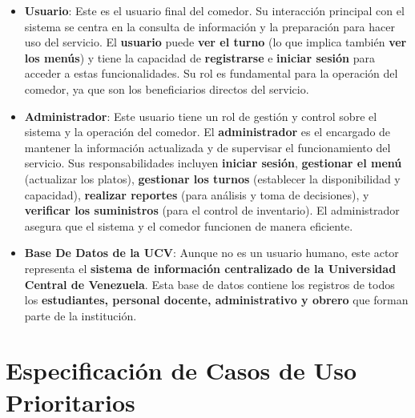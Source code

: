 \documentclass[12pt]{article}
\begin{document}
\begin{itemize}
	\item \textbf{Usuario}: Este es el usuario final del comedor. Su interacción principal con el sistema se centra en la consulta de información y la preparación para hacer uso del servicio. El \textbf{usuario} puede \textbf{ver el turno} (lo que implica también \textbf{ver los menús}) y tiene la capacidad de \textbf{registrarse} e \textbf{iniciar sesión} para acceder a estas funcionalidades. Su rol es fundamental para la operación del comedor, ya que son los beneficiarios directos del servicio.

	\item \textbf{Administrador}: Este usuario tiene un rol de gestión y control sobre el sistema y la operación del comedor. El \textbf{administrador} es el encargado de mantener la información actualizada y de supervisar el funcionamiento del servicio. Sus responsabilidades incluyen \textbf{iniciar sesión}, \textbf{gestionar el menú} (actualizar los platos), \textbf{gestionar los turnos} (establecer la disponibilidad y capacidad), \textbf{realizar reportes} (para análisis y toma de decisiones), y \textbf{verificar los suministros} (para el control de inventario). El administrador asegura que el sistema y el comedor funcionen de manera eficiente.

	\item \textbf{Base De Datos de la UCV}: Aunque no es un usuario humano, este actor representa el \textbf{sistema de información centralizado de la Universidad Central de Venezuela}. Esta base de datos contiene los registros de todos los \textbf{estudiantes, personal docente, administrativo y obrero} que forman parte de la institución.
\end{itemize}

\pagebreak

\section{Especificación de Casos de Uso Prioritarios}
\vspace{1cm}
\begin{center}
\end{center}

\pagebreak
\end{document}

